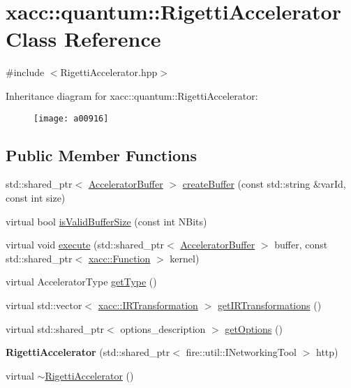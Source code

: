\hypertarget{a00916}{}\section{xacc\+:\+:quantum\+:\+:Rigetti\+Accelerator Class Reference}
\label{a00916}


{\ttfamily \#include $<$Rigetti\+Accelerator.\+hpp$>$}

Inheritance diagram for xacc\+:\+:quantum\+:\+:Rigetti\+Accelerator\+:\begin{figure}[H]
\begin{center}
\leavevmode
\texttt{[image: a00916]}
\end{center}
\end{figure}
\subsection*{Public Member Functions}
\begin{DoxyCompactItemize}
\item 
std\+::shared\+\_\+ptr$<$ \hyperlink{a01096}{Accelerator\+Buffer} $>$ \hyperlink{a00916_a731551c94b1abef40d2cf032e8712df6}{create\+Buffer} (const std\+::string \&var\+Id, const int size)
\item 
virtual bool \hyperlink{a00916_a61352c07062597aad2393fbeed4cc025}{is\+Valid\+Buffer\+Size} (const int N\+Bits)
\item 
virtual void \hyperlink{a00916_afce7bbd1b0f04300a9920952e9d12ef4}{execute} (std\+::shared\+\_\+ptr$<$ \hyperlink{a01096}{Accelerator\+Buffer} $>$ buffer, const std\+::shared\+\_\+ptr$<$ \hyperlink{a01124}{xacc\+::\+Function} $>$ kernel)
\item 
virtual Accelerator\+Type \hyperlink{a00916_aab0d4674da5273d55407b9ab77cde890}{get\+Type} ()
\item 
virtual std\+::vector$<$ \hyperlink{a01152}{xacc\+::\+I\+R\+Transformation} $>$ \hyperlink{a00916_a443683a1dfb000603c640b2ee303cf66}{get\+I\+R\+Transformations} ()
\item 
virtual std\+::shared\+\_\+ptr$<$ options\+\_\+description $>$ \hyperlink{a00916_a9ee9e62aecbccf193894ca3388676f9f}{get\+Options} ()
\item 
\mbox{\label{a00916_aa92ba39441ec9c261fbddee23a84d6ac}} 
{\bfseries Rigetti\+Accelerator} (std\+::shared\+\_\+ptr$<$ fire\+::util\+::\+I\+Networking\+Tool $>$ http)
\item 
virtual \hyperlink{a00916_a7c86895d1c29afa8b7e18476144a3fcf}{$\sim$\+Rigetti\+Accelerator} ()
\end{DoxyCompactItemize}
